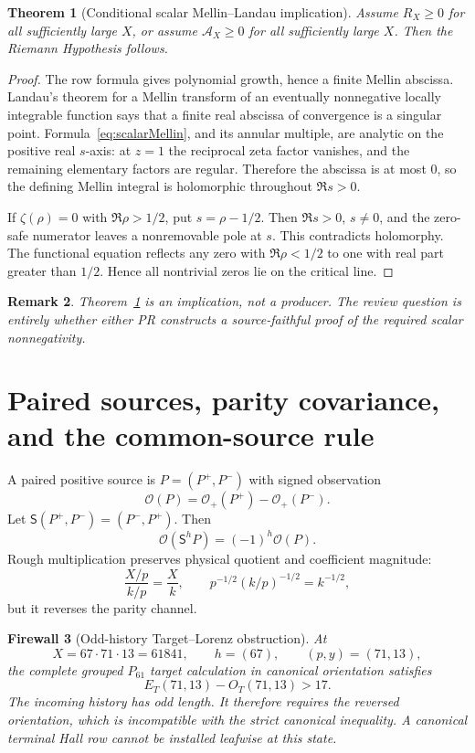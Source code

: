 \documentclass[11pt]{article}
\newtheorem{theorem}{Theorem}[section]
\newtheorem{firewall}[theorem]{Firewall}
\newtheorem{remark}[theorem]{Remark}
\newcommand{\1}{\mathbf 1}
\newcommand{\Obs}{\mathcal O}
\begin{document}
\begin{theorem}[Conditional scalar Mellin--Landau implication]\label{thm:landau}
Assume $R_X\ge0$ for all sufficiently large $X$, or assume $\mathcal A_X\ge0$ for all sufficiently large $X$.  Then the Riemann Hypothesis follows.
\end{theorem}
\begin{proof}
The row formula gives polynomial growth, hence a finite Mellin abscissa.  Landau's theorem for a Mellin transform of an eventually nonnegative locally integrable function says that a finite real abscissa of convergence is a singular point.  Formula~\eqref{eq:scalarMellin}, and its annular multiple, are analytic on the positive real $s$-axis: at $z=1$ the reciprocal zeta factor vanishes, and the remaining elementary factors are regular.  Therefore the abscissa is at most $0$, so the defining Mellin integral is holomorphic throughout $\Re s>0$.

If $\zeta(\rho)=0$ with $\Re\rho>1/2$, put $s=\rho-1/2$.  Then $\Re s>0$, $s\ne0$, and the zero-safe numerator leaves a nonremovable pole at $s$.  This contradicts holomorphy.  The functional equation reflects any zero with $\Re\rho<1/2$ to one with real part greater than $1/2$.  Hence all nontrivial zeros lie on the critical line.
\end{proof}

\begin{remark}
Theorem~\ref{thm:landau} is an implication, not a producer.  The review question is entirely whether either PR constructs a source-faithful proof of the required scalar nonnegativity.
\end{remark}

\section{Paired sources, parity covariance, and the common-source rule}

A paired positive source is $P=(P^+,P^-)$ with signed observation
\[
\Obs(P)=\Obs_+(P^+)-\Obs_+(P^-).
\]
Let $\mathsf S(P^+,P^-)=(P^-,P^+)$.  Then
\[
\Obs(\mathsf S^hP)=(-1)^h\Obs(P).
\]
Rough multiplication preserves physical quotient and coefficient magnitude:
\[
\frac{X/p}{k/p}=\frac Xk,
\qquad
p^{-1/2}(k/p)^{-1/2}=k^{-1/2},
\]
but it reverses the parity channel.

\begin{firewall}[Odd-history Target--Lorenz obstruction]\label{fw:odd}
At
\[
X=67\cdot71\cdot13=61841,
\qquad h=(67),
\qquad(p,y)=(71,13),
\]
the complete grouped $P_{61}$ target calculation in canonical orientation satisfies
\[
E_T(71,13)-O_T(71,13)>17.
\]
The incoming history has odd length.  It therefore requires the reversed orientation, which is incompatible with the strict canonical inequality.  A canonical terminal Hall row cannot be installed leafwise at this state.
\end{firewall}
\end{document}
